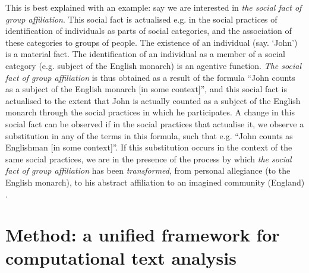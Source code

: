 This is best explained with an example: say we are interested in \emph{the social fact of group affiliation}.
This social fact is actualised e.g. in the social practices of identification of individuals as parts of social categories, and the association of these categories to groups of people.
The existence of an individual (say. `John') is a material fact.
The identification of an individual as a member of a social category (e.g. subject of the English monarch) is an agentive function.
\emph{The social fact of group affiliation} is thus obtained as a result of the formula ``John counts as a subject of the English monarch [in some context]'', and this social fact is actualised to the extent that John is actually counted as a subject of the English monarch through the social practices in which he participates.
A change in this social fact can be observed if in the social practices that actualise it, we observe a substitution in any of the terms in this formula, such that e.g. ``John counts as Englishman [in some context]''.
If this substitution occurs in the context of the same social practices, we are in the presence of the process by which \emph{the social fact of group affiliation} has been \emph{transformed}, from personal allegiance (to the English monarch), to his abstract affiliation to an imagined community (England) \citep{anderson1991}.

%
%
%
%
%
%

\section{Method: a unified framework for computational text analysis}
\label{sec:method}

